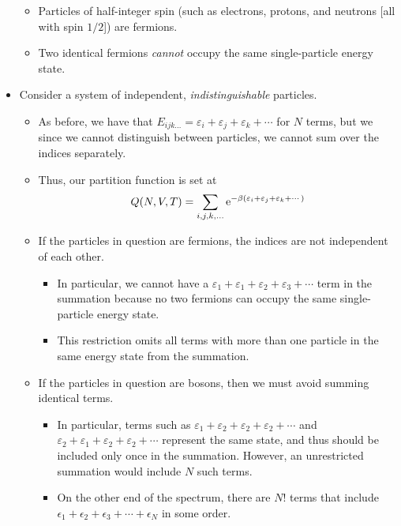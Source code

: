 \documentclass[../notes.tex]{subfiles}
\begin{document}
\begin{itemize}
    \begin{itemize}
        \item Particles of half-integer spin (such as electrons, protons, and neutrons [all with spin $1/2$]) are fermions.
        \item Two identical fermions \emph{cannot} occupy the same single-particle energy state.
    \end{itemize}
    \item Consider a system of independent, \emph{indistinguishable} particles.
    \begin{itemize}
        \item As before, we have that $E_{ijk\dots}=\varepsilon_i+\varepsilon_j+\varepsilon_k+\cdots$ for $N$ terms, but we since we cannot distinguish between particles, we cannot sum over the indices separately.
        \item Thus, our partition function is set at
        \begin{equation*}
            Q(N,V,T) = \sum_{i,j,k,\dots}\e[-\beta(\varepsilon_i+\varepsilon_j+\varepsilon_k+\cdots)]
        \end{equation*}
        \item If the particles in question are fermions, the indices are not independent of each other.
        \begin{itemize}
            \item In particular, we cannot have a $\varepsilon_1+\varepsilon_1+\varepsilon_2+\varepsilon_3+\cdots$ term in the summation because no two fermions can occupy the same single-particle energy state.
            \item This restriction omits all terms with more than one particle in the same energy state from the summation.
        \end{itemize}
        \item If the particles in question are bosons, then we must avoid summing identical terms.
        \begin{itemize}
            \item In particular, terms such as $\varepsilon_1+\varepsilon_2+\varepsilon_2+\varepsilon_2+\cdots$ and $\varepsilon_2+\varepsilon_1+\varepsilon_2+\varepsilon_2+\cdots$ represent the same state, and thus should be included only once in the summation. However, an unrestricted summation would include $N$ such terms.
            \item On the other end of the spectrum, there are $N!$ terms that include $\epsilon_1+\epsilon_2+\epsilon_3+\cdots+\epsilon_N$ in some order.

\end{itemize}
\end{itemize}
\end{itemize}
\end{document}
